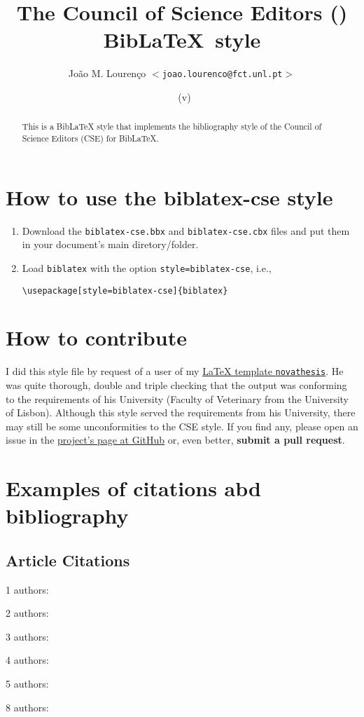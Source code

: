 \documentclass[
  a4paper, %
  11pt, %
]{article}
\title{The Council of Science Editors (\textsf{\filename}) Bib\LaTeX\ style}
\author{João M. Lourenço $<$\texttt{joao.lourenco@fct.unl.pt}$>$}
\date{\filedate\ (v\fileversion)}
\newcommand{\novathesis}{\texttt{novathesis}}
\newcommand{\nauthors}[1]{#1 authors: }
\begin{document}
  
  \maketitle

\begin{abstract}
This is a BibLaTeX style that implements the bibliography style of the Council of Science Editors (CSE) for BibLaTeX.
\end{abstract}


\section{How to use the biblatex-cse style}

\begin{enumerate}
  \item Download the \texttt{biblatex-cse.bbx} and \texttt{biblatex-cse.cbx} files and put them in your document's main diretory/folder.
  \item Load \texttt{biblatex} with the option \texttt{style=biblatex-cse}, i.e.,
\begin{verbatim}
\usepackage[style=biblatex-cse]{biblatex}  
\end{verbatim}
\end{enumerate}


\section{How to contribute}

I did this style file by request of a user of my \href{https://github.com/joaomlourenco/novathesis}{LaTeX template \novathesis}. He was quite thorough, double and triple checking that the output was conforming to the requirements of his University (Faculty of Veterinary from the University of Lisbon). Although this \texttt{\filename} style served the requirements from his University, there may still be some unconformities to the CSE style. If you find any, please open an issue in the \href{https://github.com/joaomlourenco/biblatex-cse}{project's page at GitHub} or, even better, \textbf{submit a pull request}.


\section{Examples of citations abd bibliography}
  
\subsection{Article Citations}
\indent
\par\nauthors{1}\cite{Duddington1955}
\par\nauthors{2}\cite{Asa2011}
\par\nauthors{3}\cite{Migaki1982}
\par\nauthors{4}\cite{Lysek1982}
\par\nauthors{5}\cite{Carvalho2007}
\par\nauthors{8}\cite{Riadigos2014}
\end{document}
